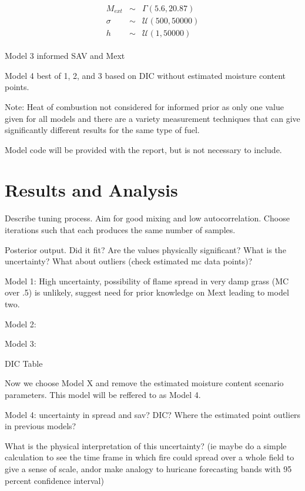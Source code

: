 \documentclass[11pt]{article}
\begin{document}
\begin{align}
\begin{array}{ccc}
M_{ext} &\sim& \Gamma(5.6,20.87) \\
\sigma &\sim& \mathcal{U}(500,50000) \\
h &\sim& \mathcal{U}(1,50000)
\end{array}
\label{eq:mod2_priors}
\end{align}

Model 3 informed SAV and Mext

Model 4 best of 1, 2, and 3 based on DIC without estimated moisture content points.

Note: Heat of combustion not considered for informed prior as only one value given for all models and there are a variety measurement techniques that can give significantly different results for the same type of fuel.

Model code will be provided with the report, but is not necessary to include.


\section{Results and Analysis}
\label{sec:res}

Describe tuning process. Aim for good mixing and low autocorrelation. Choose iterations such that each produces the same number of samples.

Posterior output. Did it fit? Are the values physically significant? What is the uncertainty? What about outliers (check estimated mc data points)? 

Model 1: High uncertainty, possibility of flame spread in very damp grass (MC over .5) is unlikely, suggest need for prior knowledge on Mext leading to model two.

Model 2:

Model 3:

DIC Table

Now we choose Model X and remove the estimated moisture content scenario parameters. This model will be reffered to as Model 4.

Model 4: uncertainty in spread and sav? DIC? Where the estimated point outliers in previous models?

What is the physical interpretation of this uncertainty? (ie maybe do a simple calculation to see the time frame in which fire could spread over a whole field to give a sense of scale, andor make analogy to huricane forecasting bands with 95 percent confidence interval) 
\end{document}
